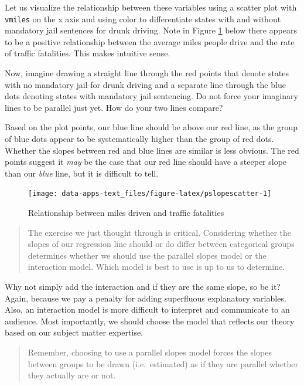 \documentclass[
]{book}
\begin{document}
Let us visualize the relationship between these variables using a scatter plot with \texttt{vmiles} on the x axis and using color to differentiate states with and without mandatory jail sentences for drunk driving. Note in Figure \ref{fig:pslopescatter} below there appears to be a positive relationship between the average miles people drive and the rate of traffic fatalities. This makes intuitive sense.

Now, imagine drawing a straight line through the red points that denote states with no mandatory jail for drunk driving and a separate line through the blue dots denoting states with mandatory jail sentencing. Do not force your imaginary lines to be parallel just yet. How do your two lines compare?

Based on the plot points, our blue line should be above our red line, as the group of blue dots appear to be systematically higher than the group of red dots. Whether the slopes between red and blue lines are similar is less obvious. The red points suggest it \emph{may} be the case that our red line should have a steeper slope than our \emph{blue} line, but it is difficult to tell.

\begin{figure}

{\centering \texttt{[image: data-apps-text\_files/figure-latex/pslopescatter-1]} 

}

\caption{Relationship between miles driven and traffic fatalities}\label{fig:pslopescatter}
\end{figure}

\begin{quote}
The exercise we just thought through is critical. Considering whether the slopes of our regression line should or do differ between categorical groups determines whether we should use the parallel slopes model or the interaction model. Which model is best to use is up to us to determine.
\end{quote}

Why not simply add the interaction and if they are the same slope, so be it? Again, because we pay a penalty for adding superfluous explanatory variables. Also, an interaction model is more difficult to interpret and communicate to an audience. Most importantly, we should choose the model that reflects our theory based on our subject matter expertise.

\begin{quote}
Remember, choosing to use a parallel slopes model forces the slopes between groups to be drawn (i.e.~estimated) as if they are parallel whether they actually are or not.
\end{quote}
\end{document}
